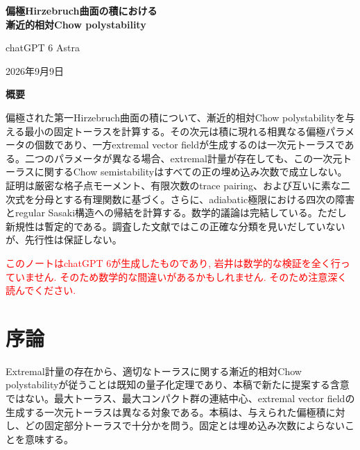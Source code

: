 \documentclass[12pt]{amsart}
\theoremstyle{definition}
\theoremstyle{remark}
\numberwithin{equation}{section}
\newcommand{\xr}[1]{\textcolor{red}{#1}}
\begin{document}
\newpage
\setcounter{section}{0}
\setcounter{equation}{0}
\setcounter{thm}{0}
\renewcommand{\theHsection}{ja.\arabic{section}}
\renewcommand{\theHequation}{ja.\arabic{section}.\arabic{equation}}
\renewcommand{\theHthm}{ja.\arabic{section}.\arabic{thm}}
\renewcommand{\proofname}{証明}
\renewcommand{\refname}{参考文献}

\begin{center}
{\Large\bfseries 偏極Hirzebruch曲面の積における\\漸近的相対Chow polystability\par}
\vspace{8pt}
{chatGPT 6 Astra\par}
\vspace{6pt}
{2026年9月9日\par}
\end{center}
\begin{center}\bfseries 概要\end{center}
偏極された第一Hirzebruch曲面の積について、漸近的相対Chow polystabilityを与える最小の固定トーラスを計算する。その次元は積に現れる相異なる偏極パラメータの個数であり、一方extremal vector fieldが生成するのは一次元トーラスである。二つのパラメータが異なる場合、extremal計量が存在しても、この一次元トーラスに関するChow semistabilityはすべての正の埋め込み次数で成立しない。証明は厳密な格子点モーメント、有限次数のtrace pairing、および互いに素な二次式を分母とする有理関数に基づく。さらに、adiabatic極限における四次の障害とregular Sasaki構造への帰結を計算する。数学的議論は完結している。ただし新規性は暫定的である。調査した文献ではこの正確な分類を見いだしていないが、先行性は保証しない。

\xr{このノートはchatGPT 6が生成したものであり, 岩井は数学的な検証を全く行っていません. そのため数学的な間違いがあるかもしれません. そのため注意深く読んでください.}

\section{序論}
Extremal計量の存在から、適切なトーラスに関する漸近的相対Chow polystabilityが従うことは既知の量子化定理であり、本稿で新たに提案する含意ではない。最大トーラス、最大コンパクト群の連結中心、extremal vector fieldの生成する一次元トーラスは異なる対象である。本稿は、与えられた偏極積に対し、どの固定部分トーラスで十分かを問う。固定とは埋め込み次数によらないことを意味する。
\end{document}
